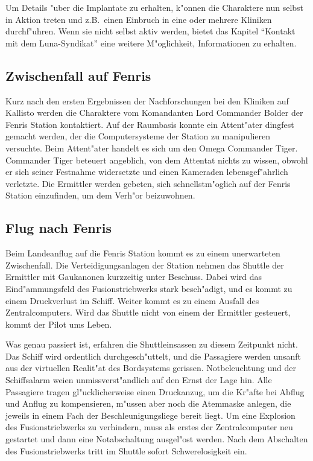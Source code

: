 \begin{remarks}
Um Details "uber die Implantate zu erhalten, k"onnen die Charaktere nun selbst in Aktion treten und z.B.~einen Einbruch in eine oder mehrere Kliniken durchf"uhren. Wenn sie nicht selbst aktiv werden, bietet das Kapitel "`Kontakt mit dem Luna-Syndikat"' eine weitere M"oglichkeit, Informationen zu erhalten.
\end{remarks}


\subsection{Zwischenfall auf Fenris}

Kurz nach den ersten Ergebnissen der Nachforschungen bei den Kliniken auf Kallisto werden die Charaktere vom Komandanten Lord Commander Bolder der Fenris Station kontaktiert. Auf der Raumbasis konnte ein Attent"ater dingfest gemacht werden, der die Computersysteme der Station zu manipulieren versuchte. Beim Attent"ater handelt es sich um den Omega Commander Tiger. Commander Tiger beteuert angeblich, von dem Attentat nichts zu wissen, obwohl er sich seiner Festnahme widersetzte und einen Kameraden lebensgef"ahrlich verletzte. Die Ermittler werden gebeten, sich schnellstm"oglich auf der Fenris Station einzufinden, um dem Verh"or beizuwohnen.

\subsection{Flug nach Fenris}

Beim Landeanflug auf die Fenris Station kommt es zu einem unerwarteten Zwischenfall. Die Verteidigungsanlagen der Station nehmen das Shuttle der Ermittler mit Gau\3kanonen kurzzeitig unter Beschuss. Dabei wird das Eind"ammungsfeld des Fusionstriebwerks stark besch"adigt, und es kommt zu einem Druckverlust im Schiff. Weiter kommt es zu einem Ausfall des Zentralcomputers. Wird das Shuttle nicht von einem der Ermittler gesteuert, kommt der Pilot ums Leben.

Was genau passiert ist, erfahren die Shuttleinsassen zu diesem Zeitpunkt nicht. Das Schiff wird ordentlich durchgesch"uttelt, und die Passagiere werden unsanft aus der virtuellen Realit"at des Bordsystems gerissen. Notbeleuchtung und der Schiffsalarm wei\3en unmissverst"andlich auf den Ernst der Lage hin. Alle Passagiere tragen gl"ucklicherweise einen Druckanzug, um die Kr"afte bei Abflug und Anflug zu kompensieren, m"ussen aber noch die Atemmaske anlegen, die jeweils in einem Fach der Beschleunigungsliege bereit liegt. Um eine Explosion des Fusionstriebwerks zu verhindern, muss als erstes der Zentralcomputer neu gestartet und dann eine Notabschaltung ausgel"ost werden. Nach dem Abschalten des Fusionstriebwerks tritt im Shuttle sofort Schwerelosigkeit ein.

